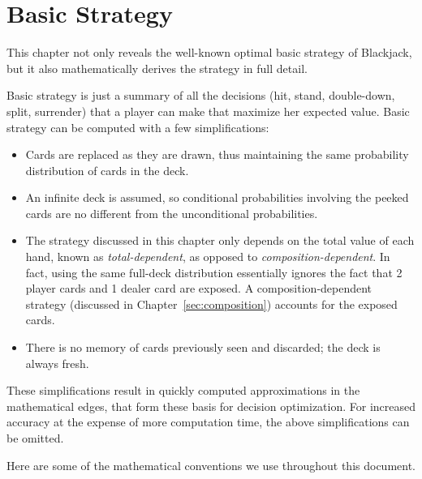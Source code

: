 
\chapter{Basic Strategy}
\label{sec:basic}

This chapter not only reveals the well-known optimal basic strategy
of Blackjack, but it also mathematically derives the strategy 
in full detail.  

Basic strategy is just a summary of all the decisions 
(hit, stand, double-down, split, surrender) that a player can 
make that maximize her expected value.  
Basic strategy can be computed with a few simplifications:
\begin{itemize}
\item Cards are replaced as they are drawn, thus maintaining the same
	probability distribution of cards in the deck.
\item An infinite deck is assumed, so conditional probabilities
	involving the peeked cards are no different from
	the unconditional probabilities.
\item The strategy discussed in this chapter only depends on the 
	total value of each hand, known as
	\emph{total-dependent}, 
	as opposed to \emph{composition-dependent}.
	In fact, using the same full-deck distribution essentially
	ignores the fact that 2 player cards and 1 dealer card
	are exposed.
	A composition-dependent strategy
	(discussed in Chapter~\ref{sec:composition})
	accounts for the exposed cards.
\item There is no memory of cards previously seen and discarded; 
	the deck is always fresh.
\end{itemize}

\noindent
These simplifications result in quickly computed approximations in the
mathematical edges, that form these basis for decision optimization.  
For increased accuracy at the expense of more computation time,
the above simplifications can be omitted.

Here are some of the mathematical conventions we use
throughout this document.

